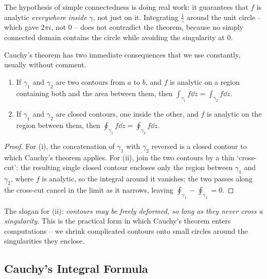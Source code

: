 The hypothesis of simple connectedness is doing real work: it guarantees that $f$ is analytic \emph{everywhere inside} $\gamma$, not just on it. Integrating $\frac 1z$ around the unit circle -- which gave $2\pi i$, not $0$ -- does not contradict the theorem, because no simply connected domain contains the circle while avoiding the singularity at $0$.

Cauchy's theorem has two immediate consequences that we use constantly, usually without comment.

\begin{proposition}
	\begin{enumerate}[label=(\roman*)]
		\item If $\gamma_1$ and $\gamma_2$ are two contours from $a$ to $b$, and $f$ is analytic on a region containing both and the area between them, then $\int_{\gamma_1} f \dd z= \int_{\gamma_2} f \dd z$.
		\item If $\gamma_1$ and $\gamma_2$ are closed contours, one inside the other, and $f$ is analytic on the region between them, then $\oint_{\gamma_1} f \dd z = \oint_{\gamma_2} f \dd z$.
	\end{enumerate}
\end{proposition}
\begin{proof}
	For (i), the concatenation of $\gamma_1$ with $\gamma_2$ reversed is a closed contour to which Cauchy's theorem applies. For (ii), join the two contours by a thin `cross-cut': the resulting single closed contour encloses only the region between $\gamma_1$ and $\gamma_2$, where $f$ is analytic, so the integral around it vanishes; the two passes along the cross-cut cancel in the limit as it narrows, leaving $\oint_{\gamma_1} - \oint_{\gamma_2} = 0$.
\end{proof}

The slogan for (ii): \emph{contours may be freely deformed, so long as they never cross a singularity}. This is the practical form in which Cauchy's theorem enters computations -- we shrink complicated contours onto small circles around the singularities they enclose.

\subsection{Cauchy's Integral Formula}

